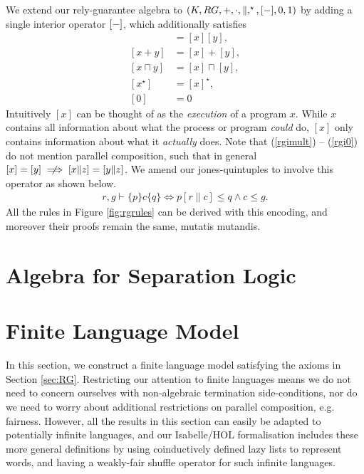 \documentclass{llncs}
\begin{document}
We extend our rely-guarantee algebra to
$(K,RG,+,\cdot,\|,^\star,[\--],0,1)$ by adding a single interior
operator $[\--]$, which additionally satisfies
\begin{align}
[xy] &= [x][y], \label{rgimult}\\
[x + y] &= [x] + [y],\\
[x \sqcap y] &= [x] \sqcap [y],\\
[x^\star] &= [x]^\star,\\
[0] &= 0 \label{rgi0}
\end{align}
Intuitively $[x]$ can be thought of as the \emph{execution} of a
program $x$. While $x$ contains all information about what the process
or program \emph{could} do, $[x]$ only contains information about what
it \emph{actually} does. Note that (\ref{rgimult}) -- (\ref{rgi0}) do
not mention parallel composition, such that in general $[x] = [y]
\centernot\implies [x\|z] = [y\|z]$. We amend our jones-quintuples to
involve this operator as shown below.
\begin{align*}
r,g \vdash \{p\} c \{q\} \iff p[r\|c] \le q \land c \le g.
\end{align*}
All the rules in Figure \ref{fig:rgrules} can be derived with this
encoding, and moreover their proofs remain the same, mutatis
mutandis.

\newpage
\section{Algebra for Separation Logic}


\newpage
\section{Finite Language Model}
\label{sec:Model}

In this section, we construct a finite language model satisfying the
axioms in Section \ref{sec:RG}. Restricting our attention to finite
languages means we do not need to concern ourselves with non-algebraic
termination side-conditions, nor do we need to worry about additional
restrictions on parallel composition, e.g. fairness. However, all the
results in this section can easily be adapted to potentially
infinite languages, and our Isabelle/HOL formalisation includes these more
general definitions by using coinductively defined lazy lists to
represent words, and having a weakly-fair shuffle operator for such
infinite languages.
\end{document}
